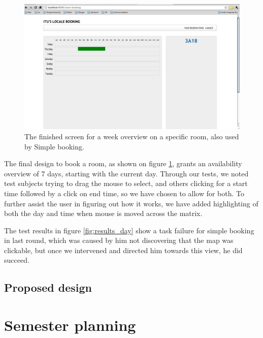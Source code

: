 \pagebreak
\begin{figure}[htb]
\begin{center}
\leavevmode
\includegraphics[width=1\textwidth]{images/weekFinal}
\end{center}
\caption{The finished screen for a week overview on a specific room, also used by Simple booking.}
\label{fig:week_final}
\end{figure}

The final design to book a room, as shown on figure \ref{fig:week_final}, grants an availability overview of 7 days, starting with the current day. Through our tests, we noted test subjects trying to drag the mouse to select, and others clicking for a start time followed by a click on end time, so we have chosen to allow for both.
To further assist the user in figuring out how it works, we have added highlighting of both the day and time when mouse is moved across the matrix.

The test results in figure \ref{fig:results_day} show a task failure for simple booking in last round, which was caused by him not discovering that the map was clickable, but once we intervened and directed him towards this view, he did succeed.


\subsection{Proposed design}
\label{sec:proposed_design}

\section{Semester planning}
\label{sec:semester_planning_ui}
